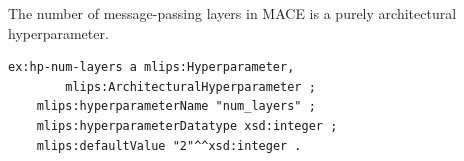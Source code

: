 The number of message-passing layers in MACE is a purely
architectural hyperparameter.
\begin{lstlisting}[language=turtle]
ex:hp-num-layers a mlips:Hyperparameter,
        mlips:ArchitecturalHyperparameter ;
    mlips:hyperparameterName "num_layers" ;
    mlips:hyperparameterDatatype xsd:integer ;
    mlips:defaultValue "2"^^xsd:integer .
\end{lstlisting}
